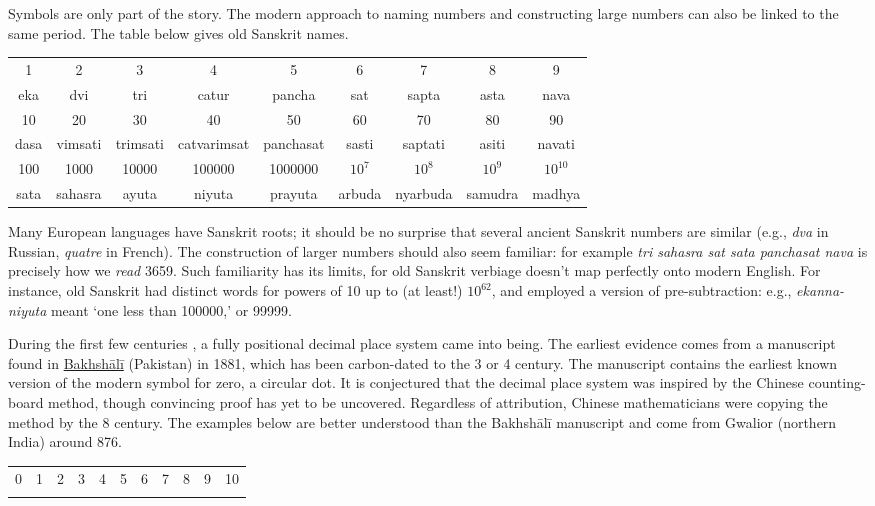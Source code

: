 Symbols are only part of the story. The modern approach to naming numbers and constructing large numbers can also be linked to the same period. The table below gives old Sanskrit names.
\begin{center}
	\begin{tabular}{ccccccccc}
		1&2&3&4&5&6&7&8&9\\
		eka&dvi&tri&catur&pancha&sat&sapta&asta&nava\\[0.3cm]
		10&20&30&40&50&60&70&80&90\\
		dasa&vimsati&trimsati&catvarimsat&panchasat&sasti&saptati&asiti&navati\\[0.3cm]
		100&1000&10000&100000&1000000&$10^7$&$10^8$&$10^9$&$10^{10}$\\
		sata&sahasra&ayuta&niyuta&prayuta&arbuda&nyarbuda&samudra&madhya
	\end{tabular}
\end{center}
Many European languages have Sanskrit roots; it should be no surprise that several ancient Sanskrit numbers are similar (e.g., \emph{dva} in Russian, \emph{quatre} in French). The construction of larger numbers should also seem familiar: for example \emph{tri sahasra sat sata panchasat nava} is precisely how we \emph{read} 3659.
\smallbreak
Such familiarity has its limits, for old Sanskrit verbiage doesn't map perfectly onto modern English. For instance, old Sanskrit had distinct words for powers of 10 up to (at least!) $10^{62}$, and employed a version of pre-subtraction: e.g., \emph{ekanna-niyuta} meant `one less than 100000,' or 99999.



During the first few centuries \AD{}\!, a fully positional decimal place system came into being. The earliest evidence comes from a manuscript found in \href{http://www.bbc.com/news/uk-england-oxfordshire-41265057}{Bakhshālī} (Pakistan) in 1881, which has been carbon-dated to the 3\rd{} or 4\th{} century. The manuscript contains the earliest known version of the modern symbol for zero, a circular dot. It is conjectured that the decimal place system was inspired by the Chinese counting-board method, though convincing proof has yet to be uncovered. Regardless of attribution, Chinese mathematicians were copying the method by the 8\th{} century.\smallbreak
The examples below are better understood than the Bakhshālī manuscript and come from Gwalior (northern India) around 876.
\begin{center}
	\begin{tabular}{ccccccccccc}
		0&1&2&3&4&5&6&7&8&9&10\\
		\IndiaGzero&\IndiaGone&\IndiaGtwo&\IndiaGthree&\IndiaGfour&\IndiaGfive&\IndiaGsix&\IndiaGseven&\IndiaGeight&\IndiaGnine&\IndiaGten
	\end{tabular}
\end{center}

